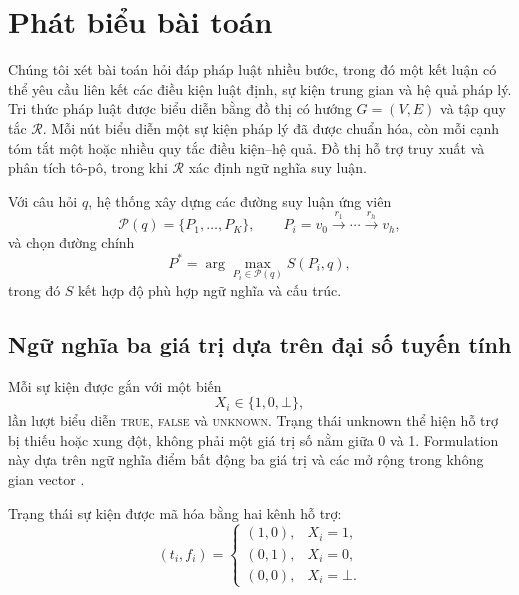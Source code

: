 \section{Phát biểu bài toán}
\label{sec:problem_formulation}

Chúng tôi xét bài toán hỏi đáp pháp luật nhiều bước, trong đó một kết luận có
thể yêu cầu liên kết các điều kiện luật định, sự kiện trung gian và hệ quả pháp
lý. Tri thức pháp luật được biểu diễn bằng đồ thị có hướng $G=(V,E)$ và tập quy
tắc $\mathcal{R}$. Mỗi nút biểu diễn một sự kiện pháp lý đã được chuẩn hóa, còn
mỗi cạnh tóm tắt một hoặc nhiều quy tắc điều kiện--hệ quả. Đồ thị hỗ trợ truy
xuất và phân tích tô-pô, trong khi $\mathcal{R}$ xác định ngữ nghĩa suy luận.

Với câu hỏi $q$, hệ thống xây dựng các đường suy luận ứng viên
\begin{equation}
\mathcal{P}(q)=\{P_1,\ldots,P_K\},\qquad
P_i=v_0\xrightarrow{r_1}\cdots\xrightarrow{r_h}v_h,
\end{equation}
và chọn đường chính
\begin{equation}
P^*=\arg\max_{P_i\in\mathcal{P}(q)}S(P_i,q),
\end{equation}
trong đó $S$ kết hợp độ phù hợp ngữ nghĩa và cấu trúc.

\subsection{Ngữ nghĩa ba giá trị dựa trên đại số tuyến tính}

Mỗi sự kiện được gắn với một biến
\begin{equation}
X_i\in\{1,0,\bot\},
\end{equation}
lần lượt biểu diễn \textsc{true}, \textsc{false} và \textsc{unknown}. Trạng
thái unknown thể hiện hỗ trợ bị thiếu hoặc xung đột, không phải một giá trị số
nằm giữa 0 và 1. Formulation này dựa trên ngữ nghĩa điểm bất động ba giá trị
\cite{kleene1952metamathematics,fitting1985kripke} và các mở rộng trong không
gian vector \cite{sato2020threevalued}.

Trạng thái sự kiện được mã hóa bằng hai kênh hỗ trợ:
\begin{equation}
(t_i,f_i)=
\begin{cases}
(1,0), & X_i=1,\\
(0,1), & X_i=0,\\
(0,0), & X_i=\bot.
\end{cases}
\label{eq:two_channel_state}
\end{equation}

